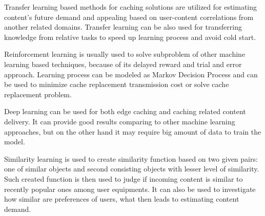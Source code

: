 \documentclass[conference]{IEEEtran}
\begin{document}
Transfer learning based methods for caching solutions are utilized for estimating content's future demand and appealing based on user-content correlations from another related domains\cite{cache1}. Transfer learning can be also used for transferring knowledge from relative tasks to speed up learning process and avoid cold start\cite{cache3}. \par
Reinforcement learning is usually used to solve subproblem of other machine learning based techniques, because of its delayed reward and trial and error approach. Learning process can be modeled as Markov Decision Process and can be used to minimize cache replacement transmission cost or solve cache replacement problem\cite{cache3}. \par
Deep learning can be used for both edge caching and caching related content delivery. It can provide good results comparing to other machine learning approaches, but on the other hand it may require big amount of data to train the model\cite{cache1}. \par
Similarity learning is used to create similarity function based on two given pairs: one of similar objects and second consisting objects with lesser level of similarity. Such created function is then used to judge if incoming content is similar to recently popular ones among user equipments\cite{cache1}. It can also be used to investigate how similar are preferences of users, what then leads to estimating content demand. \par \newpage
\end{document}
